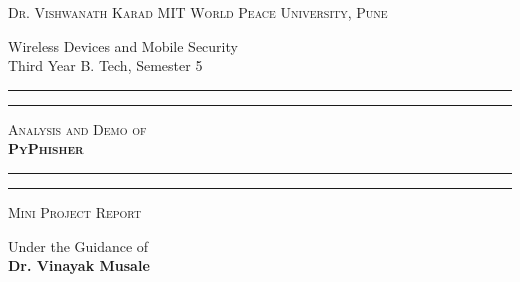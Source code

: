 \documentclass[openany]{report}
\begin{document}
\begin{titlepage}
    \centering


    \huge\textsc{
        Dr. Vishwanath Karad MIT World Peace University, Pune
    }\\

    \vspace{0.75\baselineskip} %

    \LARGE{
        Wireless Devices and Mobile Security\\
        Third Year B. Tech, Semester 5\\
    }

    \vfill %


    \rule{\textwidth}{1.6pt}\vspace*{-\baselineskip}\vspace*{2pt}
    \rule{\textwidth}{0.6pt}
    \vspace{0.75\baselineskip} %



    \huge{\textsc{
            Analysis and Demo of\\
            \textbf{PyPhisher}
        }} \\



    \vspace{0.5\baselineskip} %
    \rule{\textwidth}{0.6pt}\vspace*{-\baselineskip}\vspace*{2.8pt}
    \rule{\textwidth}{1.6pt}

    \vspace{1\baselineskip} %


    \LARGE\textsc{
        Mini Project Report
    } %


    \vspace{0.5\baselineskip} %
    Under the Guidance of\\
    \Large{
        \textbf{Dr. Vinayak Musale}
    }
    \vfill


\end{titlepage}
\end{document}
